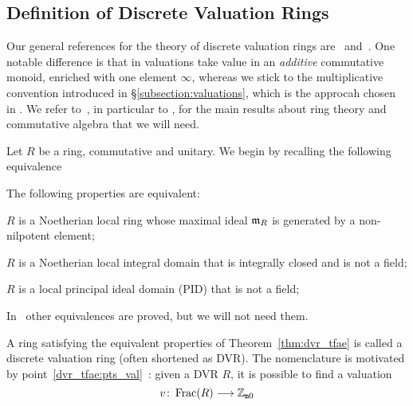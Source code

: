 \documentclass[sigplan,10pt,anonymous,review]{acmart}
\begin{document}
\subsection{Definition of Discrete Valuation Rings}\label{subsection:def_dvr}
Our general references for the theory of discrete valuation rings are~\cite{Ser62} and~\cite[Chapitre~VI]{Bou85}. One notable difference is that in \cite[Chapitre~VI]{Bou85} valuations take value in an \emph{additive} commutative monoid, enriched with one element $\infty$, whereas we stick to the multiplicative convention introduced in \S\ref{subsection:valuations}, which is the approcah chosen in \mathlib. We refer to~\cite{Bou07}, in particular to \cite[Chapitre~IV]{Bou07}, for the main results about ring theory and commutative algebra that we will need.

Let $R$ be a ring,  commutative and unitary. We begin by recalling the following equivalence
\begin{theorem}\label{thm:dvr_tfae}
The following properties are equivalent:
\begin{listResults}
\item $R$ is a Noetherian local ring whose maximal ideal $\mathfrak{m}_{R}$ is generated by a non-nilpotent element;
\item $R$ is a Noetherian local integral domain that is integrally closed and is not a field;
\item $R$ is a local principal ideal domain \textup{(}PID\textup{)} that is not a field;
\item {}\label{dvr_tfae:pts_val}
\end{listResults}
\end{theorem}
\begin{remark}
In~\cite[Chapitre~VI, \S3, n$^\circ$~6, Proposition~8]{Bou85} other equivalences are proved, but we will not need them.
\end{remark}
A ring satisfying the equivalent properties of Theorem~\ref{thm:dvr_tfae} is called a discrete valuation ring (often shortened as DVR). The nomenclature is motivated by point~\ref{dvr_tfae:pts_val}~\ibid: given a DVR $R$, it is possible to find a valuation
\[
v\colon \operatorname{Frac}(R)\longrightarrow \mathbb{Z}_{\mathtt{m}0}
\]
\end{document}

